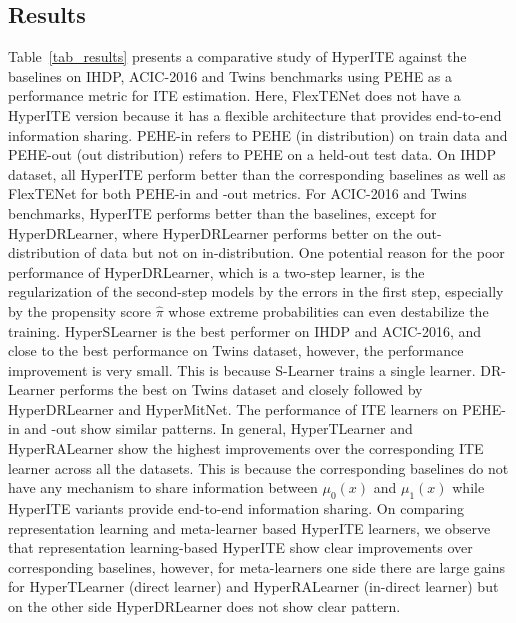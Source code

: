 \documentclass{article}
\begin{document}
\subsection{Results}
\label{subsec_results}
Table~\ref{tab_results} presents a comparative study of HyperITE against the baselines on IHDP, ACIC-2016 and Twins benchmarks using PEHE as a performance metric for ITE estimation. Here, FlexTENet does not have a HyperITE version because it has a flexible architecture that provides end-to-end information sharing. PEHE-in refers to PEHE (in distribution) on train data and PEHE-out (out distribution) refers to PEHE on a held-out test data.
On IHDP dataset, all HyperITE perform better than the corresponding baselines as well as FlexTENet for both PEHE-in and -out metrics.
For ACIC-2016 and Twins benchmarks, HyperITE performs better than the baselines, except for HyperDRLearner, where HyperDRLearner performs better on the out-distribution of data but not on in-distribution. One potential reason for the poor performance of HyperDRLearner, which is a two-step learner, is the regularization of the second-step models by the errors in the first step, especially by the propensity score $\hat{\pi}$ whose extreme probabilities can even destabilize the training.
HyperSLearner is the best performer on IHDP and ACIC-2016, and close to the best performance on Twins dataset, however, the performance improvement is very small. This is because S-Learner trains a single learner. DR-Learner performs the best on Twins dataset and closely followed by HyperDRLearner and HyperMitNet.
The performance of ITE learners on PEHE-in and -out show similar patterns.
In general, HyperTLearner and HyperRALearner show the highest improvements over the corresponding ITE learner across all the datasets. This is because the corresponding baselines do not have any mechanism to share information between $\mu_0(x)$ and $\mu_1(x)$ while HyperITE variants provide end-to-end information sharing.
On comparing representation learning and meta-learner based HyperITE learners, we observe that representation learning-based HyperITE show clear improvements over corresponding baselines, however, for meta-learners one side there are large gains for HyperTLearner (direct learner) and HyperRALearner (in-direct learner) but on the other side HyperDRLearner does not show clear pattern.
\end{document}
